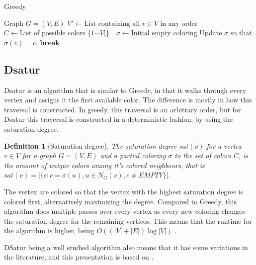 \documentclass[a4paper]{article}
\newtheorem{definition}{Definition}[section]
\newcommand{\algorithmicbreak}{\textbf{break}}
\newcommand{\BREAK}{\STATE \algorithmicbreak}
\begin{document}
\begin{algorithm}[H]
  \caption{Greedy}
  \label{alg:greedy}
  \begin{algorithmic}[1]
      \REQUIRE Graph $G = (V,E)$
      \STATE $V' \leftarrow \text{List containing all $v \in V$ in any order}$
      \STATE $C \leftarrow \text{List of possible colors $\{1 \cdots V| \}$ }$
      \STATE $\sigma \leftarrow \text{Initial empty coloring}$
                \STATE Update $\sigma$ so that $\sigma(v) = c$.
                \BREAK
            \ENDIF
        \ENDFOR
    \ENDFOR
  \end{algorithmic}
\end{algorithm}
\subsection{Dsatur}

Dsatur is an algorithm that is similar to Greedy, in that it walks through every
vertex and assigns it the first available color. The difference is mostly in
how this traversal is constructed. In greedy, this traversal is an arbitrary
order, but for Dsatur this traversal is constructed in a deterministic fashion,
by using the saturation degree.

\begin{definition}[Saturation degree]
    The saturation degree $sat(v)$ for a vertex $v \in V$ for a graph $G =
    (V,E)$ and a partial coloring $\sigma$ to the set of colors $C$, is the amount of unique colors among
    it's colored neighbours, that is $sat(v) = |\{c  : c = \sigma(u), u \in N_G(v),c \neq EMPTY  \}|$.
\end{definition}

The vertex are colored so that the vertex with the highest saturation degree is
colored first, alternatively maximizing the degree. Compared to Greedy, this
algorithm does multiple passes over every vertex as every new coloring changes
the saturation degree for the remaining vertices. This means that the runtime
for the algorithm is higher, being
$O((|V|+|E|)\log{|V|})$ \cite{Constructive}.

DSatur being a well studied algorithm also means that it has some variations in 
the literature, and this presentation is based on \cite{Constructive}.
\end{document}
